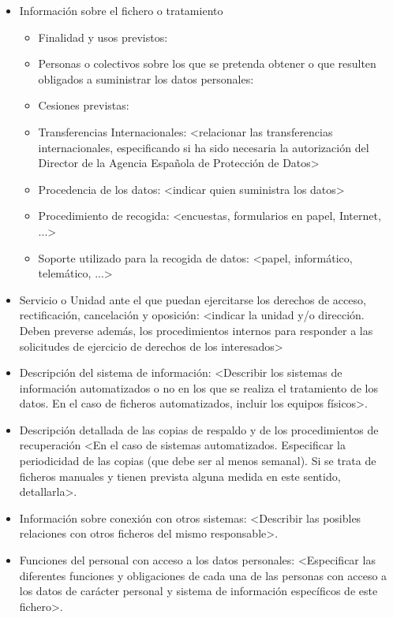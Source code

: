 \documentclass[a4paper,11pt,bibtotoc,noliststotoc]{scrbook}
\begin{document}
\begin{itemize}
\item Información sobre el fichero o tratamiento
	\begin{itemize}
	\item Finalidad y usos previstos:
	\item Personas o colectivos sobre los que se pretenda obtener o que resulten obligados a suministrar los datos personales:
	\item Cesiones previstas:
	\item Transferencias Internacionales: <relacionar las transferencias internacionales, especificando si ha sido necesaria la autorización del Director de la Agencia Española de Protección de Datos>
	\item Procedencia de los datos: <indicar quien suministra los datos>
	\item Procedimiento de recogida: <encuestas, formularios en papel, Internet, ...>
	\item Soporte utilizado para la recogida de datos: <papel, informático, telemático, ...>
	\end{itemize}

\item Servicio o Unidad ante el que puedan ejercitarse los derechos de acceso, rectificación, cancelación y oposición: <indicar la unidad y/o dirección. Deben preverse además, los procedimientos internos para responder a las solicitudes de ejercicio de derechos de los interesados>

\item Descripción del sistema de información: <Describir los sistemas de información automatizados o no en los que se realiza el tratamiento de los datos. En el caso de ficheros automatizados, incluir los equipos físicos>.

\item Descripción detallada de las copias de respaldo y de los procedimientos de recuperación <En el caso de sistemas automatizados. Especificar la periodicidad de las copias (que debe ser al menos semanal). Si se trata de ficheros manuales y tienen prevista alguna medida en este sentido, detallarla>.

\item Información sobre conexión con otros sistemas: <Describir las posibles relaciones con otros ficheros del mismo responsable>.

\item Funciones del personal con acceso a los datos personales: <Especificar las diferentes funciones y obligaciones de cada una de las personas con acceso a los datos de carácter personal y sistema de información específicos de este fichero>.


\end{itemize}
\end{document}
